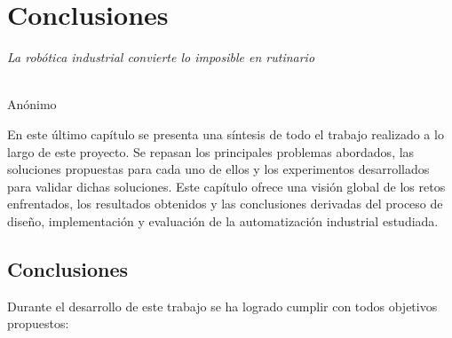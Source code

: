 \chapter{Conclusiones}
\label{cap:capitulo5}

\begin{flushright}
\begin{minipage}[]{10cm}
\emph{La robótica industrial convierte lo imposible en rutinario}\\
\end{minipage}\\

Anónimo\\
\end{flushright}

\vspace{1cm}

En este último capítulo se presenta una síntesis de todo el trabajo realizado a lo largo de este proyecto. Se repasan los principales problemas abordados, las soluciones propuestas para cada uno de ellos y los experimentos desarrollados para validar dichas soluciones. Este capítulo ofrece una visión global de los retos enfrentados, los resultados obtenidos y las conclusiones derivadas del proceso de diseño, implementación y evaluación de la automatización industrial estudiada.


\section{Conclusiones}

Durante el desarrollo de este trabajo se ha logrado cumplir con todos objetivos propuestos: 

